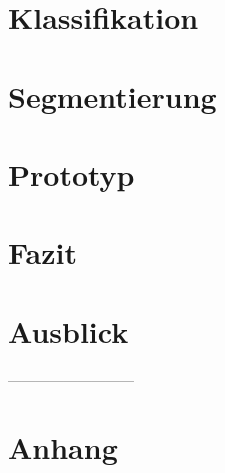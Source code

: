 \documentclass[10pt]{report}
\begin{document}
\chapter{Klassifikation}





\chapter{Segmentierung}




\chapter{Prototyp}







\chapter{Fazit}





\chapter{Ausblick}


---------------------------
\chapter{Anhang}





\end{document}
